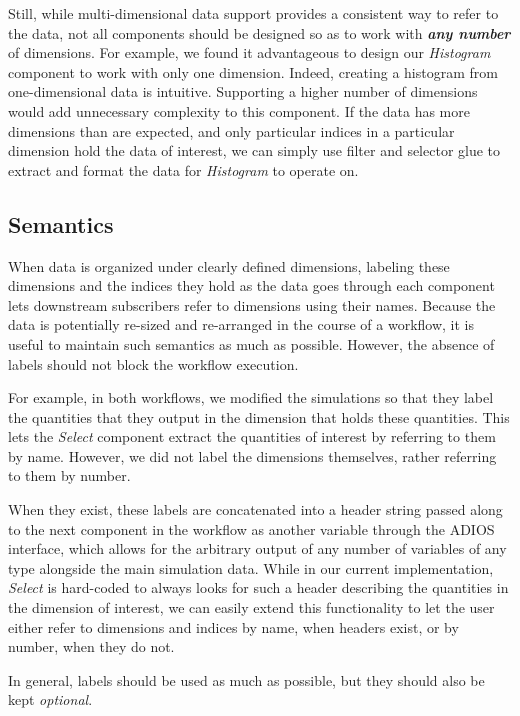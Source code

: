 \documentclass[conference]{IEEEtran}
\begin{document}
Still, while multi-dimensional data support provides a consistent way to refer
to the data, not all components should be designed so as to work with
\textbf{\em any number} of dimensions. For example, we found it advantageous to
design our {\em Histogram} component to work with only one dimension.
Indeed, creating a histogram from one-dimensional data is intuitive.
Supporting a higher number of dimensions would add unnecessary complexity
to this component. If the data has more dimensions than are expected,
and only particular indices in a particular dimension hold the data of interest,
we can simply use filter and selector glue to extract and format the data for
{\em Histogram} to operate on.


\subsection{Semantics}

When data is organized under clearly defined dimensions, labeling these
dimensions and the indices they hold
as the data goes through each component lets downstream subscribers
refer to dimensions using their names. Because the data is potentially re-sized
and re-arranged in the course of a workflow, it is useful to maintain such
semantics as much as possible. However, the absence of labels should not block
the workflow execution.

For example, in both workflows, we modified the simulations so that
they label the quantities that they output in the dimension that holds
these quantities. This lets the {\em Select} component extract the quantities
of interest by referring to them by name. However, we did not label the dimensions
themselves, rather referring to them by number. 

When they exist, these labels are concatenated into a header string
passed along to the next component in the workflow as another variable
through the ADIOS interface, which
allows for the arbitrary output of any number of variables of any type
alongside the main simulation data.
While in our current implementation, {\em Select} is hard-coded to
always looks for such a header describing the quantities
in the dimension of interest, 
we can easily extend this functionality to let the user either refer
to dimensions and indices by name, when headers exist, or by number,
when they do not.

In general, labels should be used as much as possible, but they
should also be kept {\em optional}.
\end{document}
